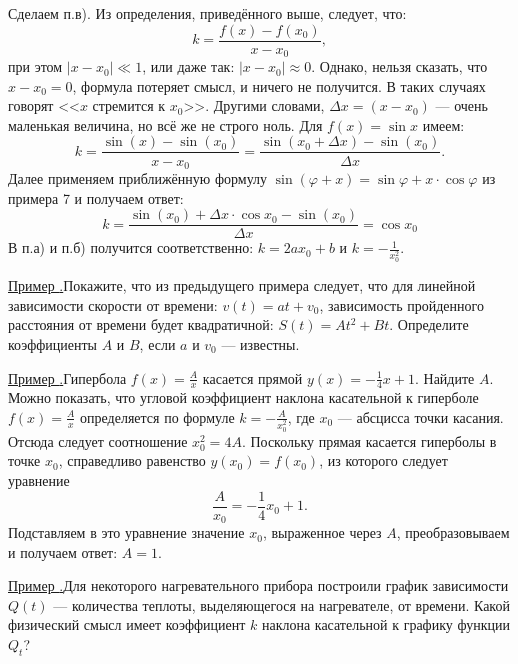 \documentclass[10pt, xetex]{article}
\newcounter{zadacha}
\newcommand{\z}{\par\vspace{0.6\baselineskip plus 1pt minus 1pt}\noindent\addtocounter{zadacha}{1}\hypertarget{z\thezadacha}{}\hyperlink{an\thezadacha}{{Пример {\arabic{zadacha}.}\:\hskip0.15mm}}}
\begin{document}
Сделаем п.\:в). Из определения, приведённого выше, следует, что: 
\[
k = \frac{f(x)-f(x_{0})}{x-x_{0}},
\]
 при этом $|x-x_{0}| \ll 1$, или даже так: $|x-x_{0}| \approx 0$. Однако, нельзя сказать, что $x-x_{0} = 0$, формула потеряет смысл, и ничего не получится. В таких случаях говорят <<$x$ стремится к $x_{0}$>>. Другими словами, $\Delta x = (x-x_{0})$ --- очень маленькая величина, но всё же не строго ноль. Для $f(x) = \sin x$ имеем:
\[
k = \frac{\sin(x)-\sin(x_{0})}{x-x_{0}} = \frac{\sin(x_{0}+\Delta x)-\sin(x_{0})}{\Delta x}.
\] 
Далее применяем приближённую формулу $\sin\left(\varphi+x \right)= \sin\varphi+x\cdot \cos\varphi$ из примера 7 и получаем ответ: 
\[
k = \frac{\sin(x_{0})+\Delta x\cdot\cos x_{0}-\sin(x_{0})}{\Delta x} = \cos x_{0}
\]
В п.\:а) и п.\:б) получится соответственно: $k= 2ax_{0}+b$ и $k = \displaystyle{-\frac{1}{x_{0}^{2}}}$.
\z Покажите, что из предыдущего примера следует, что для линейной зависимости скорости от времени: $v(t) = at + v_{0}$, зависимость пройденного расстояния от времени будет квадратичной: $S(t) = At^{2}+Bt$. Определите коэффициенты $A$ и $B$, если $a$ и $v_{0}$ --- известны.

\z Гипербола $f(x) = \displaystyle{\frac{A}{x}}$ касается прямой $y(x) = \displaystyle{-\frac{1}{4}x+1}$. Найдите $A$.
\baselineskip
Можно показать, что угловой коэффициент наклона касательной к гиперболе $f(x) = \displaystyle{\frac{A}{x}}$ определяется по формуле $k = \displaystyle{-\frac{A}{x_{0}^{2}}}$, где $x_{0}$ --- абсцисса точки касания. Отсюда следует соотношение $x_{0}^{2} = 4A$. Поскольку прямая касается гиперболы в точке $x_{0}$, справедливо равенство $y(x_{0}) = f(x_{0})$, из которого следует уравнение
\[
\frac{A}{x_{0}} = -\frac{1}{4}x_{0}+1.
\]
Подставляем в это уравнение значение $x_{0}$, выраженное через $A$, преобразовываем и получаем ответ: $A = 1$.

\z Для некоторого нагревательного прибора построили график зависимости $Q(t)$ --- количества теплоты, выделяющегося на нагревателе, от времени. Какой физический смысл имеет коэффициент $k$ наклона касательной к графику функции $Q_{t}$?  
\end{document}
